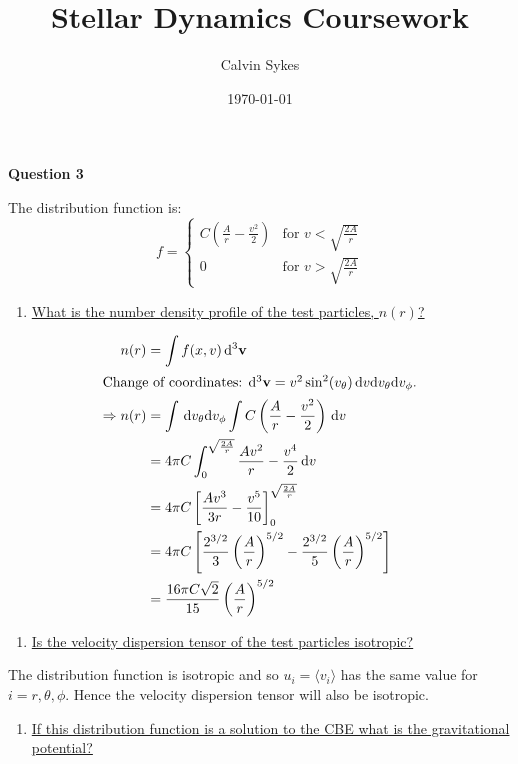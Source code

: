 \documentclass{article}
\title{Stellar Dynamics Coursework}
\date{\today}
\author{Calvin Sykes}
\begin{document}
\maketitle

{\Large{\bfseries Question 3}\normalsize}

The distribution function is:
\begin{equation}
  f=
  \begin{cases}
    C\left(\frac{A}{r}-\frac{v^2}{2}\right)&\mbox{for } v<\sqrt{\frac{2A}{r}}\\
    0 &\mbox{for } v>\sqrt{\frac{2A}{r}}
  \end{cases}
\end{equation}

\begin{enumerate}[label=(\alph*)]
\item\underline{What is the number density profile of the test particles, $n(r)$?}
\end{enumerate}

\begin{align}
  n(r)&=\int f(x,v)\,\mathrm{d}^3\mathbf{v}\\
  \intertext{Change of coordinates: $\mathrm{d}^3\mathbf{v}=v^2\sin^2(v_\theta)\,\mathrm{d}v\mathrm{d}v_\theta\mathrm{d}v_\phi$.}
  \Rightarrow n(r)&=\int\,\mathrm{d}v_\theta\mathrm{d}v_\phi\int C\left(\frac{A}{r}-\frac{v^2}{2}\right)\,\mathrm{d}v\\
                  &=4\pi C\int_0^{\sqrt{\frac{2A}{r}}}\frac{Av^2}{r}-\frac{v^4}{2}\,\mathrm{d}v\\
                  &=4\pi C\left[\frac{Av^3}{3r}-\frac{v^5}{10}\right]_0^{\sqrt{\frac{2A}{r}}}\\
                  &=4\pi C\left[\frac{2^{3/2}}{3}\left(\frac{A}{r}\right)^{5/2}-\frac{2^{3/2}}{5}\left(\frac{A}{r}\right)^{5/2}\right]\\
                  &=\frac{16\pi C\sqrt{2}}{15}\left(\frac{A}{r}\right)^{5/2}
\end{align}
\begin{enumerate}[resume, label=(\alph*)]
\item\underline{Is the velocity dispersion tensor of the test particles isotropic?}
\end{enumerate}

The distribution function is isotropic and so $u_i=\langle v_i \rangle$ has the same value for $i=r,\theta,\phi$. Hence the velocity dispersion tensor  will also be isotropic.

\begin{enumerate}[resume, label=(\alph*)]
\item\underline{If this distribution function is a solution to the CBE what is the gravitational potential?}
\end{enumerate}
\end{document}
